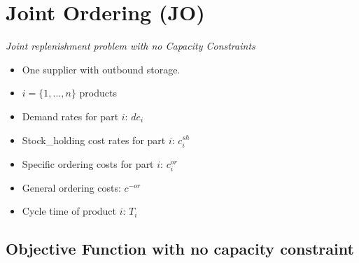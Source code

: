 \documentclass[
]{article}
\newenvironment{Shaded}{\begin{snugshade}}{\end{snugshade}}
\newcommand{\CommentTok}[1]{\textcolor[rgb]{0.56,0.35,0.01}{\textit{#1}}}
\newcommand{\DataTypeTok}[1]{\textcolor[rgb]{0.13,0.29,0.53}{#1}}
\newcommand{\FloatTok}[1]{\textcolor[rgb]{0.00,0.00,0.81}{#1}}
\newcommand{\KeywordTok}[1]{\textcolor[rgb]{0.13,0.29,0.53}{\textbf{#1}}}
\newcommand{\NormalTok}[1]{#1}
\newcommand{\OperatorTok}[1]{\textcolor[rgb]{0.81,0.36,0.00}{\textbf{#1}}}
\newcommand{\StringTok}[1]{\textcolor[rgb]{0.31,0.60,0.02}{#1}}
\providecommand{\tightlist}{%
  \setlength{\itemsep}{0pt}\setlength{\parskip}{0pt}}
\begin{document}
\hypertarget{joint-ordering-jo}{%
\section{Joint Ordering (JO)}\label{joint-ordering-jo}}

\emph{Joint replenishment problem with no Capacity Constraints}

\begin{itemize}
\tightlist
\item
  One supplier with outbound storage.
\item
  \(i=\{1,...,n\}\) products
\item
  Demand rates for part \(i\): \(de_i\)
\item
  Stock\_holding cost rates for part \(i\): \(c_i^{sh}\)
\item
  Specific ordering costs for part \(i\): \(c_i^{or}\)
\item
  General ordering costs: \(c^{-or}\)
\item
  Cycle time of product \(i\): \(T_i\)
\end{itemize}

\begin{Shaded}
\end{Shaded}

\hypertarget{objective-function-with-no-capacity-constraint}{%
\subsection{Objective Function with no capacity
constraint}\label{objective-function-with-no-capacity-constraint}}
\end{document}
